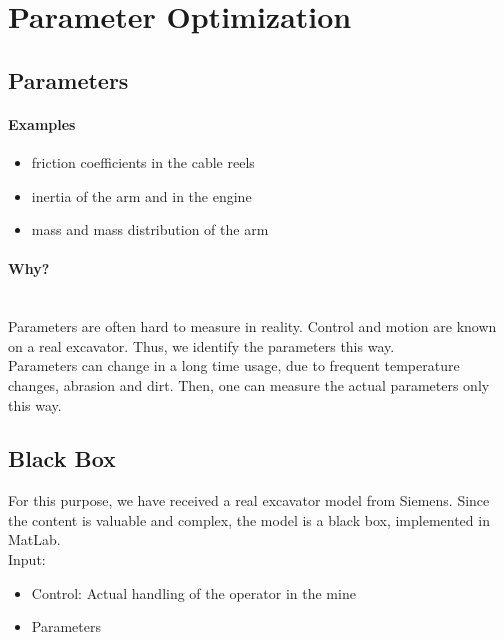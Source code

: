 \documentclass{article}
\begin{document}
\section{Parameter Optimization}

\subsection{Parameters}

\paragraph{Examples}

\begin{itemize}
	\item{friction coefficients in the cable reels}
	\item{inertia of the arm and in the engine}
	\item{mass and mass distribution of the arm}
\end{itemize}

\paragraph{Why?} \hfill\\

Parameters are often hard to measure in reality. Control and motion are known on a real excavator. Thus, we identify the parameters this way. \\

Parameters can change in a long time usage, due to frequent temperature changes, abrasion and dirt. Then, one can measure the actual parameters only this way.

\subsection{Black Box}

For this purpose, we have received a real excavator model from Siemens. Since the content is valuable and complex, the model is a black box, implemented in MatLab. \\

Input:

\begin{itemize}
	\item{Control: Actual handling of the operator in the mine}
	\item{Parameters}
\end{itemize}
\end{document}
